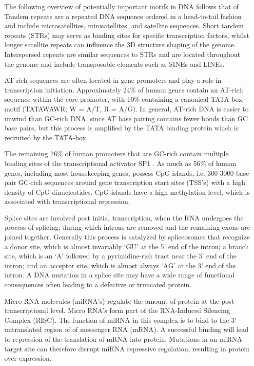 \documentclass[12pt]{article}
\begin{document}
The following overview of potentially important motifs in DNA follows that of \citet{boeva2016analysis}. Tandem repeats are a repeated DNA sequence ordered in a head-to-tail fashion and include microsatellites, minisatellites, and satellite sequences. Short tandem repeats (STRs) may serve as binding sites for specific transcription factors, whilst longer satellite repeats can influence the 3D structure shaping of the genome. Interspersed repeats are similar sequences to STRs and are located throughout the genome and include transposable elements such as SINEs and LINEs. 

AT-rich sequences are often located in gene promoters and play a role in transcription initiation. Approximately 24\% of human genes contain an AT-rich sequence within the core promoter, with 10\% containing a canonical TATA-box motif (TATAWAWR; W = A/T, R = A/G). In general, AT-rich DNA is easier to unwind than GC-rich DNA, since AT base pairing contains fewer bonds than GC base pairs, but this process is amplified by the TATA binding protein which is recruited by the TATA-box. 

The remaining 76\% of human promoters that are GC-rich contain multiple binding sites of the transcriptional activator SP1 \citep{yang2007prevalence}. As much as 56\% of human genes, including most housekeeping genes, possess CpG islands, i.e. 300-3000 base pair GC-rich sequences around gene transcription start sites (TSS's) with a high density of CpG dinucleotides. CpG islands have a high methylation level, which is associated with transcriptional repression. 

Splice sites are involved post initial transcription, when the RNA undergoes the process of splicing, during which introns are removed and the remaining exons are joined together. Generally this process is catalyzed by spliceosomes that recognize a donor site, which is almost invariably `GU' at the 5' end of the intron; a branch site, which is an `A' followed by a pyrimidine-rich tract near the 3' end of the intron; and an acceptor site, which is almost always `AG' at the 3' end of the intron. A DNA mutation in a splice site may have a wide range of functional consequences often leading to a defective or truncated protein.  

Micro RNA molecules (miRNA's) regulate the amount of protein at the post-transcriptional level. Micro RNA's form part of the RNA-Induced Silencing Complex (RISC). The function of miRNA in this complex is to bind to the 3' untranslated region of of messenger RNA (mRNA). A successful binding will lead to repression of the translation of mRNA into protein. Mutations in an miRNA target site can therefore disrupt miRNA repressive regulation, resulting in protein over expression.
\end{document}
